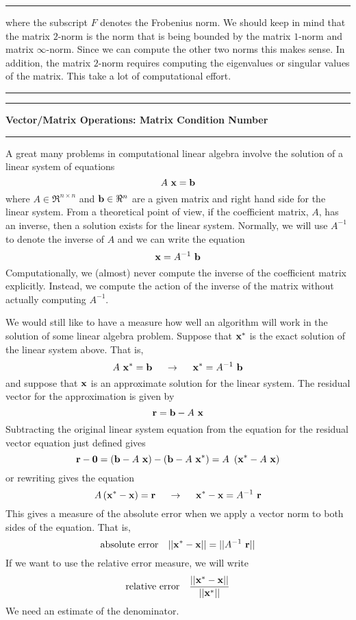 \documentclass[10pt,fleqn]{article}
\begin{document}
\vskip0.1in\hrule\vskip0.1in
where the subscript $F$ denotes the Frobenius norm. We should keep in mind that
the matrix $2$-norm is the norm that is being bounded by the matrix $1$-norm and
matrix $\infty$-norm. Since we can compute the other two norms this makes sense.
In addition, the matrix $2$-norm requires computing the eigenvalues or singular
values of the matrix. This take a lot of computational effort.
\vskip0.1in\hrule\vskip0.1in
\newpage
\vskip0.1in\hrule\vskip0.1in
\noindent
{\bf Vector/Matrix Operations: Matrix Condition Number}
\vskip0.1in\hrule\vskip0.1in
\noindent
A great many problems in computational linear algebra involve the solution of a
linear system of equations
$$
  A\ {\bf x} = {\bf b}
$$
where $A\in\Re^{n\times n}$ and ${\bf b}\in\Re^n$ are a given matrix and right
hand side for the linear system. From a theoretical point of view, if the
coefficient matrix, $A$, has an inverse, then a solution exists for the linear
system. Normally, we will use $A^{-1}$ to denote the inverse of $A$ and we can
write the equation
$$
  {\bf x} = A^{-1}\ {\bf b}
$$ 
Computationally, we (almost) never compute the inverse of the coefficient matrix
explicitly. Instead, we compute the action of the inverse of the matrix without
actually computing $A^{-1}$.

We would still like to have a measure how well an algorithm will work in the
solution of some linear algebra problem. Suppose that ${\bf x^*}$ is the exact
solution of the linear system above. That is,
$$
  A\ {\bf x^*} = {\bf b}\ \ \ \ \rightarrow\ \ \ \ {\bf x^*} = A^{-1}\ {\bf b}
$$
and suppose that ${\bf x}$ is an approximate solution for the linear system. 
The residual vector for the approximation is given by
$$
  {\bf r} = {\bf b} - A\ {\bf x}
$$
Subtracting the original linear system equation from the equation for the
residual vector equation just defined gives
$$
  {\bf r} - {\bf 0}
    = \left( {\bf b} - A\ {\bf x} \right)
                           - \left( {\bf b} - A\ {\bf x^*} \right)
    = A\ \left( {\bf x^*} - A\ {\bf x} \right)
$$
or rewriting gives the equation
$$
  A \left( {\bf x^*} - {\bf x} \right) = {\bf r}
   \ \ \ \ \rightarrow \ \ \ \ {\bf x^*} - {\bf x} = A^{-1}\ {\bf r}
$$
This gives a measure of the absolute error when we apply a vector norm to both
sides of the equation. That is,
$$
  \makebox{absolute error }\ \ || {\bf x^*} - {\bf x} || = || A^{-1}\ {\bf r} ||
$$
If we want to use the relative error measure, we will write
$$
  \makebox{relative error }\ \ {{
                                 || {\bf x^*} - {\bf x} ||
                               }\over{
                                 || {\bf x^*} ||
                               }}
$$
We need an estimate of the denominator.
\end{document}
